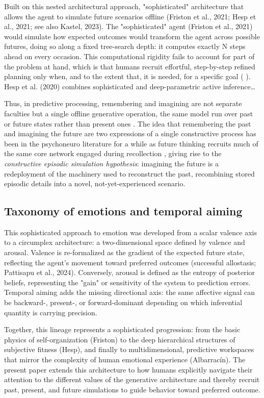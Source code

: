\documentclass[11pt,a4paper]{article}
\newcommand{\rr}{\color{red!70!black}}
\begin{document}
{\rr
Built on this nested architectural approach, "sophisticated" architecture that allows the agent to simulate future scenarios offline (Friston et al., 2021; Hesp et al., 2021; see also Kastel, 2023). The "sophisticated" agent (Friston et al., 2021) would simulate how expected outcomes would transform the agent across possible futures, doing so along a fixed tree-search depth: it computes exactly N steps ahead on every occasion. This computational rigidity fails to account for part of the problem at hand, which is that humans recruit effortful, step-by-step refined planning only when, and to the extent that, it is needed, for a specific goal ( ). Hesp et al. (2020) combines sophisticated and deep-parametric active inference…

Thus, in predictive processing, remembering and imagining are not separate faculties but a single offline generative operation, the same model run over past or future states rather than present ones \citep{fristondeeptemporal2017,spensburgess2024,schacteraddis2007}. The idea that remembering the past and imagining the future are two expressions of a single constructive process has been in the psychoneuro literature for a while as future thinking recruits much of the same core network engaged during recollection \citep{schacteraddis2007,szpunar2010,schacter2012}, giving rise to the \emph{constructive episodic simulation hypothesis}: imagining the future is a redeployment of the machinery used to reconstruct the past, recombining stored episodic details into a novel, not-yet-experienced scenario. 



\subsection{Taxonomy of emotions and temporal aiming}

This sophisticated approach to emotion was developed from a scalar valence axis to a circumplex architecture: a two-dimensional space defined by valence and arousal. Valence is re-formalized as the gradient of the expected future state, reflecting the agent's movement toward preferred outcomes (successful allostasis; Pattisapu et al., 2024). Conversely, arousal is defined as the entropy of posterior beliefs, representing the "gain" or sensitivity of the system to prediction errors.
Temporal aiming adds the missing directional axis: the same affective signal can be backward-, present-, or forward-dominant depending on which inferential quantity is carrying precision.

Together, this lineage represents a sophisticated progression: from the basic physics of self-organization (Friston) to the deep hierarchical structures of subjective fitness (Hesp), and finally to multidimensional, predictive workspaces that mirror the complexity of human emotional experience (Albarracín).
The present paper extends this architecture to how humans explicitly navigate their attention to the different values of the generative architecture and thereby recruit past, present, and future simulations to guide behavior toward preferred outcome.}
\end{document}
